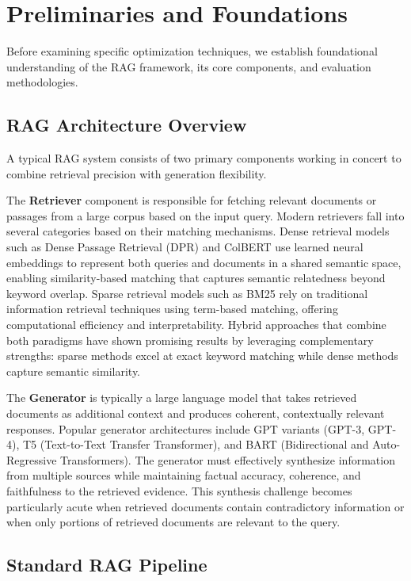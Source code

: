 \documentclass[11pt]{article}
\begin{document}
\section{Preliminaries and Foundations}

Before examining specific optimization techniques, we establish foundational understanding of the RAG framework, its core components, and evaluation methodologies.

\subsection{RAG Architecture Overview}

A typical RAG system consists of two primary components working in concert to combine retrieval precision with generation flexibility.

The \textbf{Retriever} component is responsible for fetching relevant documents or passages from a large corpus based on the input query. Modern retrievers fall into several categories based on their matching mechanisms. Dense retrieval models such as Dense Passage Retrieval (DPR) and ColBERT use learned neural embeddings to represent both queries and documents in a shared semantic space, enabling similarity-based matching that captures semantic relatedness beyond keyword overlap. Sparse retrieval models such as BM25 rely on traditional information retrieval techniques using term-based matching, offering computational efficiency and interpretability. Hybrid approaches that combine both paradigms have shown promising results by leveraging complementary strengths: sparse methods excel at exact keyword matching while dense methods capture semantic similarity.

The \textbf{Generator} is typically a large language model that takes retrieved documents as additional context and produces coherent, contextually relevant responses. Popular generator architectures include GPT variants (GPT-3, GPT-4), T5 (Text-to-Text Transfer Transformer), and BART (Bidirectional and Auto-Regressive Transformers). The generator must effectively synthesize information from multiple sources while maintaining factual accuracy, coherence, and faithfulness to the retrieved evidence. This synthesis challenge becomes particularly acute when retrieved documents contain contradictory information or when only portions of retrieved documents are relevant to the query.

\subsection{Standard RAG Pipeline}
\end{document}
